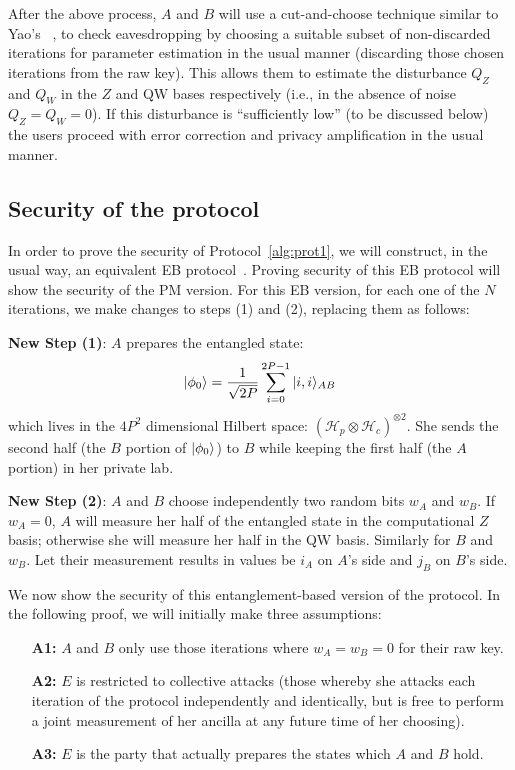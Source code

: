 \begin{protocol}
After the above process, $A$ and $B$ will use a cut-and-choose technique similar to Yao's ~\cite{yao:86}, to check eavesdropping by choosing a suitable subset of non-discarded iterations for parameter estimation in the usual manner (discarding those chosen iterations from the raw key). This allows them to estimate the disturbance $Q_Z$ and $Q_W$ in the $Z$ and QW bases respectively (i.e., in the absence of noise $Q_Z = Q_W = 0$).  If this disturbance is ``sufficiently low'' (to be discussed below) the users proceed with error correction and privacy amplification in the usual manner.

\end{protocol}
\subsection{Security of the protocol}

In order to prove the security of Protocol~\ref{alg:prot1}, we will construct, in the usual way, an equivalent EB protocol~\cite{ben:bra:mer:92,lo:cha:99}. Proving security of this EB protocol will show the security of the PM version. For this EB version, for each one of the $N$ iterations, we make changes to steps (1) and (2), replacing them as follows:\vspace{5mm}

\textbf{New Step (1)}: $A$ prepares the entangled state:
\[
| \phi_0 \rangle = \frac{1}{\sqrt{2P}}\sum_{i=0}^{2P-1}| i,i \rangle_{AB}
\]
which lives in the $4P^2$ dimensional Hilbert space: $\left(\mathcal{H}_p\otimes\mathcal{H}_c\right)^{\otimes 2}$.  She sends the second half (the $B$ portion of $| \phi_0 \rangle$) to $B$ while keeping the first half (the $A$ portion) in her private lab. \vspace{5mm}

\textbf{New Step (2)}: $A$ and $B$ choose independently two random bits $w_A$ and $w_B$.  If $w_A = 0$, $A$ will measure her half of the entangled state in the computational $Z$ basis; otherwise she will measure her half in the QW basis.  Similarly for $B$ and $w_B$.  Let their measurement results in values be $i_A$ on $A$'s side and $j_B$ on $B$'s side.

We now show the security of this entanglement-based version of the protocol.  In the following proof, we will initially make three assumptions:
\begin{enumerate}
  \item[\bf A1:] $A$ and $B$ only use those iterations where $w_A = w_B = 0$ for their raw key.

  \item[\bf A2:] $E$ is restricted to collective attacks (those whereby she attacks each iteration of the protocol independently and identically, but is free to perform a joint measurement of her ancilla at any future time of her choosing).

  \item[\bf A3:] $E$ is the party that actually prepares the states which $A$ and $B$ hold.
\end{enumerate}

